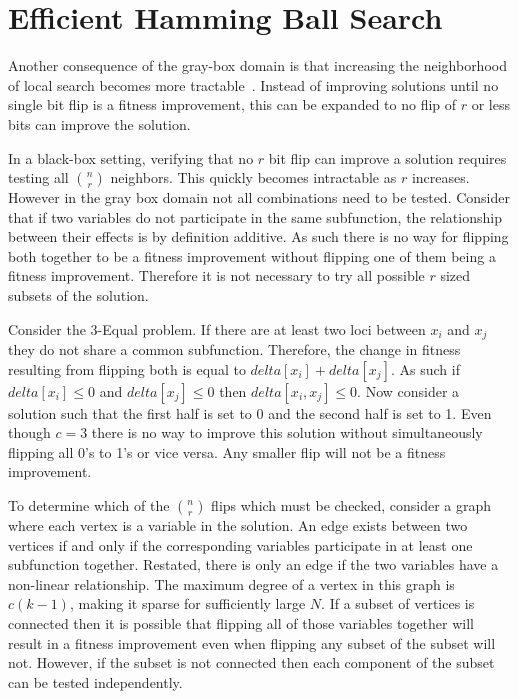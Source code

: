 \section{Efficient Hamming Ball Search}
Another consequence of the gray-box domain is that increasing the neighborhood of local search becomes
more tractable~\cite{chicano:2014:ball}.  Instead of improving solutions until no single bit flip
is a fitness improvement, this can be expanded to no flip of $r$ or less bits can improve the solution.

In a black-box setting, verifying that no $r$ bit flip can improve a solution requires testing all
$n \choose r$ neighbors. This quickly becomes intractable as $r$ increases. However in the gray
box domain not all combinations need to be tested. Consider that if two variables do not participate
in the same subfunction, the relationship between their effects is by definition additive. As such
there is no way for flipping both together to be a fitness improvement without flipping one of them
being a fitness improvement. Therefore it is not necessary to try all possible $r$ sized subsets
of the solution.

Consider the 3-Equal problem.  If there are at least two loci between $x_i$ and $x_j$ they do
not share a common subfunction. Therefore, the change in fitness resulting from flipping
both is equal to $delta[x_i] + delta[x_j]$. As such if $delta[x_i] \leq 0$ and $delta[x_j] \leq 0$
then $delta[x_i,x_j] \leq 0$. Now consider a solution such that the first half is set to 0
and the second half is set to 1. Even though $c=3$ there is no way to improve this solution without
simultaneously flipping all 0's to 1's or vice versa. Any smaller flip will not
be a fitness improvement.

To determine which of the $n \choose r$ flips which must be checked, consider a graph where
each vertex is a variable in the solution. An edge exists between two vertices if and only
if the corresponding variables participate in at least one subfunction together. Restated,
there is only an edge if the two variables have a non-linear relationship. The maximum
degree of a vertex in this graph is $c(k-1)$, making it sparse for sufficiently large $N$.
If a subset of vertices is connected then it is possible that flipping all of those
variables together will result in a fitness improvement even when flipping any subset
of the subset will not. However, if the subset is not connected then each component
of the subset can be tested independently.

